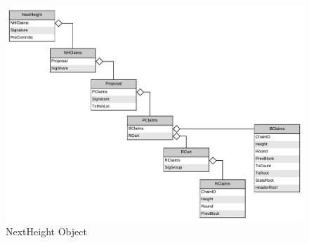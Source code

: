 \begin{figure}[H]
    \centering
    \includegraphics[scale=0.5]{figures/NextHeight_Object.pdf}
    \caption{NextHeight Object}
\end{figure}
